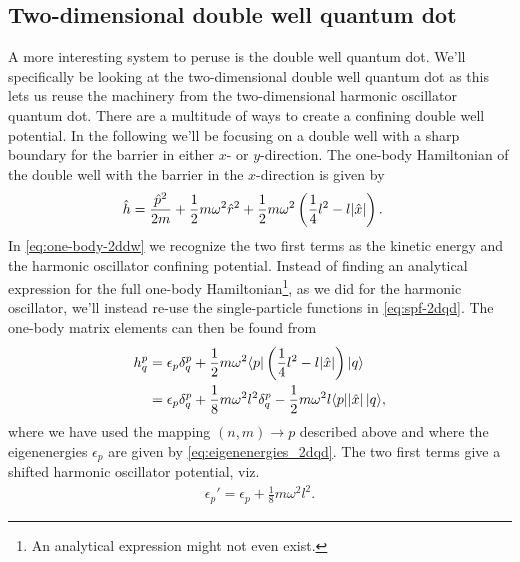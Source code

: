     \subsection{Two-dimensional double well quantum dot}
        A more interesting system to peruse is the double well quantum dot.
        We'll specifically be looking at the two-dimensional double well quantum
        dot as this lets us reuse the machinery from the two-dimensional
        harmonic oscillator quantum dot.
        There are a multitude of ways to create a confining double well
        potential.
        In the following we'll be focusing on a double well with a sharp
        boundary for the barrier in either $x$- or $y$-direction.
        The one-body Hamiltonian of the double well with the barrier in the
        $x$-direction is given by
        \begin{align}
            \onehamil
            &=
            \frac{\momentum^2}{2m}
            + \half m \omega^2 \position[r]^2
            + \half m \omega^2 \para{
                \frac{1}{4} l^2 - l\abs{\position}
            }.
            \label{eq:one-body-2ddw}
        \end{align}
        In \autoref{eq:one-body-2ddw} we recognize the two first terms as the
        kinetic energy and the harmonic oscillator confining potential.
        Instead of finding an analytical expression for the full one-body
        Hamiltonian\footnote{%
            An analytical expression might not even exist.
        }, as we did for the harmonic oscillator, we'll instead re-use
        the single-particle functions in \autoref{eq:spf-2dqd}.
        The one-body matrix elements can then be found from
        \begin{align}
            h^{p}_{q}
            &= \epsilon_{p}\delta^{p}_{q}
            + \frac{1}{2} m \omega^2\langle p |\left( 
                \frac{1}{4} l^2 - l \abs{\hat{x}}
             \right)| q \rangle
            \\
            &= \epsilon_{p}\delta^{p}_{q}
            + \frac{1}{8} m \omega^2 l^2 \delta^{p}_{q}
            - \frac{1}{2} m \omega^2 l \langle p |\abs{\hat{x}}| q \rangle,
        \end{align}
        where we have used the mapping $(n, m) \to p$ described above and where
        the eigenenergies $\epsilon_p$ are given by
        \autoref{eq:eigenenergies_2dqd}.
        The two first terms give a shifted harmonic oscillator potential, viz.
        \begin{align}
            \epsilon_p' = \epsilon_p + \frac{1}{8} m \omega^2 l^2.
        \end{align}
